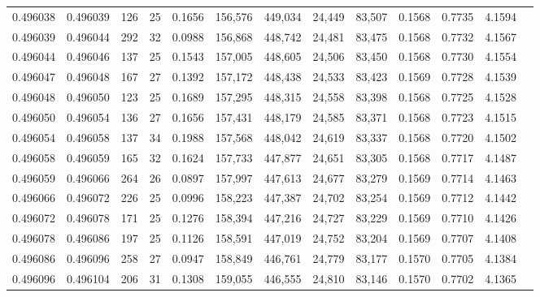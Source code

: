 \begin{tabular}{rrrrrrrrrrrrr}
0.496038 & 0.496039 & 126 &  25 &                                     0.1656 & 156,576 & 449,034 &  24,449 &  83,507 & 0.1568 & 0.7735 & 4.1594 \\
0.496039 & 0.496044 & 292 &  32 &                                     0.0988 & 156,868 & 448,742 &  24,481 &  83,475 & 0.1568 & 0.7732 & 4.1567 \\
0.496044 & 0.496046 & 137 &  25 &                                     0.1543 & 157,005 & 448,605 &  24,506 &  83,450 & 0.1568 & 0.7730 & 4.1554 \\
0.496047 & 0.496048 & 167 &  27 &                                     0.1392 & 157,172 & 448,438 &  24,533 &  83,423 & 0.1569 & 0.7728 & 4.1539 \\
0.496048 & 0.496050 & 123 &  25 &                                     0.1689 & 157,295 & 448,315 &  24,558 &  83,398 & 0.1568 & 0.7725 & 4.1528 \\
0.496050 & 0.496054 & 136 &  27 &                                     0.1656 & 157,431 & 448,179 &  24,585 &  83,371 & 0.1568 & 0.7723 & 4.1515 \\
0.496054 & 0.496058 & 137 &  34 &                                     0.1988 & 157,568 & 448,042 &  24,619 &  83,337 & 0.1568 & 0.7720 & 4.1502 \\
0.496058 & 0.496059 & 165 &  32 &                                     0.1624 & 157,733 & 447,877 &  24,651 &  83,305 & 0.1568 & 0.7717 & 4.1487 \\
0.496059 & 0.496066 & 264 &  26 &                                     0.0897 & 157,997 & 447,613 &  24,677 &  83,279 & 0.1569 & 0.7714 & 4.1463 \\
0.496066 & 0.496072 & 226 &  25 &                                     0.0996 & 158,223 & 447,387 &  24,702 &  83,254 & 0.1569 & 0.7712 & 4.1442 \\
0.496072 & 0.496078 & 171 &  25 &                                     0.1276 & 158,394 & 447,216 &  24,727 &  83,229 & 0.1569 & 0.7710 & 4.1426 \\
0.496078 & 0.496086 & 197 &  25 &                                     0.1126 & 158,591 & 447,019 &  24,752 &  83,204 & 0.1569 & 0.7707 & 4.1408 \\
0.496086 & 0.496096 & 258 &  27 &                                     0.0947 & 158,849 & 446,761 &  24,779 &  83,177 & 0.1570 & 0.7705 & 4.1384 \\
0.496096 & 0.496104 & 206 &  31 &                                     0.1308 & 159,055 & 446,555 &  24,810 &  83,146 & 0.1570 & 0.7702 & 4.1365 \\

\end{tabular}
